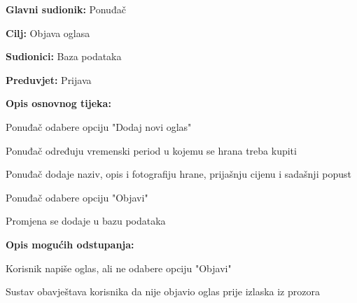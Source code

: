 					\noindent {}
					\begin{packed_item}
						
						\item \textbf{Glavni sudionik: } Ponuđač
						\item  \textbf{Cilj:} Objava oglasa
						\item  \textbf{Sudionici:} Baza podataka
						\item  \textbf{Preduvjet:} Prijava 
						
						\item  \textbf{Opis osnovnog tijeka:} 
						
						\item[] \begin{packed_enum}
							
							\item Ponuđač odabere opciju "Dodaj novi oglas"
							
							\item Ponuđač određuju vremenski period u kojemu se hrana treba kupiti
							
							\item Ponuđač dodaje naziv, opis i fotografiju hrane, prijašnju cijenu i sadašnji popust
							
							
							\item Ponuđač odabere opciju "Objavi"
							
							\item Promjena se dodaje u bazu podataka
							
							
						\end{packed_enum}
						
						\item  \textbf{Opis mogućih odstupanja:}
						
						\item[] \begin{packed_item}
							
							\item[2.a] Korisnik napiše oglas, ali ne odabere opciju "Objavi"
							\item[] \begin{packed_enum}
								
								\item Sustav obavještava korisnika da nije objavio oglas prije izlaska iz prozora
								
							\end{packed_enum}
							
							
						\end{packed_item}
					\end{packed_item}
					
